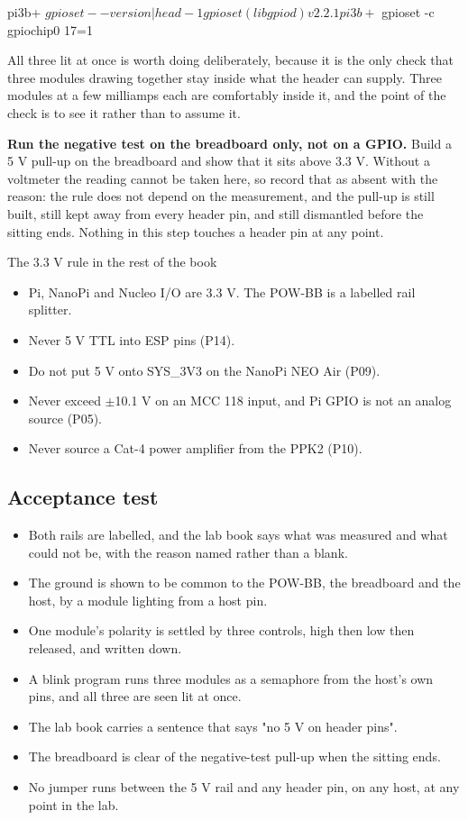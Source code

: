 \begin{steps}
\begin{plaincode}
pi3b+ $ gpioset --version | head -1
gpioset (libgpiod) v2.2.1

pi3b+ $ gpioset -c gpiochip0 17=1
\end{plaincode}
All three lit at once is worth doing deliberately, because it is the only check that three modules drawing together stay inside what the header can supply. Three modules at a few milliamps each are comfortably inside it, and the point of the check is to see it rather than to assume it.

\item \textbf{Run the negative test on the breadboard only, not on a GPIO.} Build a 5 V pull-up on the breadboard and show that it sits above 3.3 V. Without a voltmeter the reading cannot be taken here, so record that as absent with the reason: the rule does not depend on the measurement, and the pull-up is still built, still kept away from every header pin, and still dismantled before the sitting ends. Nothing in this step touches a header pin at any point.
\end{steps}

\begin{rulebox}{The 3.3 V rule in the rest of the book}
\begin{itemize}
\item Pi, NanoPi and Nucleo I/O are 3.3 V. The POW-BB is a labelled rail splitter.
\item Never 5 V TTL into ESP pins (P14).
\item Do not put 5 V onto SYS\_3V3 on the NanoPi NEO Air (P09).
\item Never exceed $\pm$10.1 V on an MCC 118 input, and Pi GPIO is not an analog source (P05).
\item Never source a Cat-4 power amplifier from the PPK2 (P10).
\end{itemize}
\end{rulebox}

\subsection*{Acceptance test}

\begin{itemize}
\item Both rails are labelled, and the lab book says what was measured and what could not be, with the reason named rather than a blank.
\item The ground is shown to be common to the POW-BB, the breadboard and the host, by a module lighting from a host pin.
\item One module's polarity is settled by three controls, high then low then released, and written down.
\item A blink program runs three modules as a semaphore from the host's own pins, and all three are seen lit at once.
\item The lab book carries a sentence that says "no 5 V on header pins".
\item The breadboard is clear of the negative-test pull-up when the sitting ends.
\item No jumper runs between the 5 V rail and any header pin, on any host, at any point in the lab.
\end{itemize}

